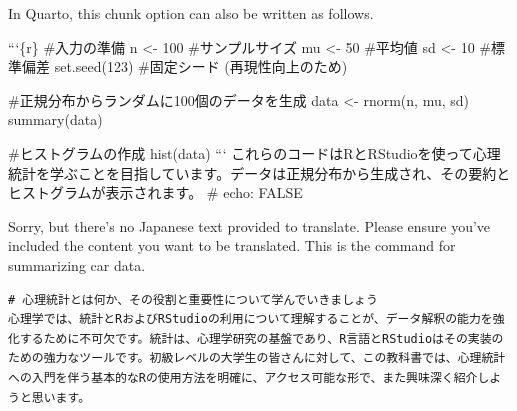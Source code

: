 \documentclass[
  a4paper,
]{book}
\begin{document}
In Quarto, this chunk option can also be written as follows.

```\{r\} \#入力の準備 n \textless- 100 \#サンプルサイズ mu \textless- 50
\#平均値 sd \textless- 10 \#標準偏差 set.seed(123) \#固定シード
(再現性向上のため)

\#正規分布からランダムに100個のデータを生成 data \textless- rnorm(n, mu,
sd) summary(data)

\#ヒストグラムの作成 hist(data) ```
これらのコードはRとRStudioを使って心理統計を学ぶことを目指しています。データは正規分布から生成され、その要約とヒストグラムが表示されます。
\#\textbar{} echo: FALSE

Sorry, but there's no Japanese text provided to translate. Please ensure
you've included the content you want to be translated. This is the
command for summarizing car data.

\begin{verbatim}
# 心理統計とは何か、その役割と重要性について学んでいきましょう
心理学では、統計とRおよびRStudioの利用について理解することが、データ解釈の能力を強化するために不可欠です。統計は、心理学研究の基盤であり、R言語とRStudioはその実装のための強力なツールです。初級レベルの大学生の皆さんに対して、この教科書では、心理統計への入門を伴う基本的なRの使用方法を明確に、アクセス可能な形で、また興味深く紹介しようと思います。
\end{verbatim}
\end{document}
